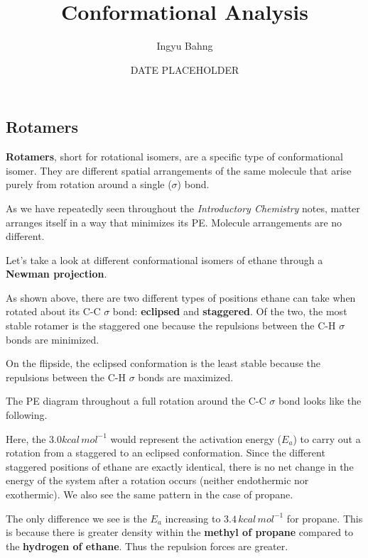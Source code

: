 \documentclass[10pt]{article}
\title{Conformational Analysis}
\date{DATE PLACEHOLDER}
\author{Ingyu Bahng}
\begin{document}


\subsection{Rotamers}

  \textbf{Rotamers}, short for rotational isomers, are a specific type of conformational isomer. They are different spatial arrangements of the same molecule that arise purely from rotation around a single ($\sigma$) bond.

  As we have repeatedly seen throughout the \textit{Introductory Chemistry} notes, matter arranges itself in a way that minimizes its PE. Molecule arrangements are no different.

  Let's take a look at different conformational isomers of ethane through a \textbf{Newman projection}.


  As shown above, there are two different types of positions ethane can take when rotated about its C-C $\sigma$ bond: \textbf{eclipsed} and \textbf{staggered}. Of the two, the most stable rotamer is the staggered one because the   repulsions between the C-H $\sigma$ bonds are minimized.

  On the flipside, the eclipsed conformation is the least stable because the   repulsions between the C-H $\sigma$ bonds are maximized.

  The PE diagram throughout a full rotation around the C-C $\sigma$ bond looks like the following.


  Here, the $3.0kcal\,mol^{-1}$ would represent the activation energy ($E_a$) to carry out a rotation from a staggered to an eclipsed conformation. Since the different staggered positions of ethane are exactly identical, there is no net change in the energy of the system after a rotation occurs (neither endothermic nor exothermic). We also see the same pattern in the case of propane.


  The only difference we see is the $E_a$ increasing to $3.4\,kcal\,mol^{-1}$ for propane. This is because there is greater  density within the \textbf{methyl of propane} compared to the \textbf{hydrogen of ethane}. Thus the   repulsion forces are greater.
\end{document}
